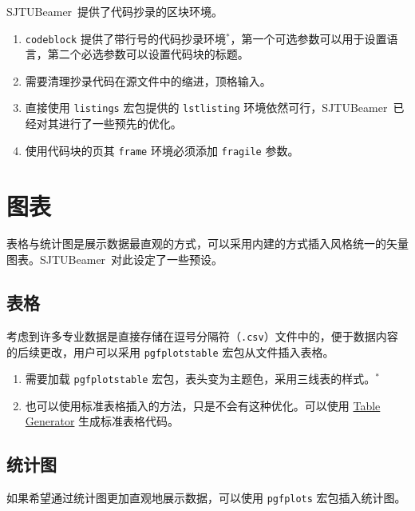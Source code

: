 \documentclass[
    UTF8,
    heading=true,
    12pt,
    a4paper
]{ctexrep}
\def\themename{\textsf{SJTUBeamer}}
\begin{document}
    \themename\ 提供了代码抄录的区块环境。


    \begin{enumerate}\small
        \item \texttt{codeblock} 提供了带行号的代码抄录环境$^*$，第一个可选参数可以用于设置语言，第二个必选参数可以设置代码块的标题。
        \item 需要清理抄录代码在源文件中的缩进，顶格输入。
        \item 直接使用 \texttt{listings} 宏包提供的 \texttt{lstlisting} 环境依然可行，\themename\ 已经对其进行了一些预先的优化。
        \item[\faWarning] 使用代码块的页其 \texttt{frame} 环境必须添加 \texttt{fragile} 参数。
    \end{enumerate}

    \chapter{图表}

    表格与统计图是展示数据最直观的方式，可以采用内建的方式插入风格统一的矢量图表。\themename\ 对此设定了一些预设。

    \section{表格}

    考虑到许多专业数据是直接存储在逗号分隔符（\texttt{.csv}）文件中的，便于数据内容的后续更改，用户可以采用 \texttt{pgfplotstable} 宏包从文件插入表格。


    \begin{enumerate}\small
        \item 需要加载 \texttt{pgfplotstable} 宏包，表头变为主题色，采用三线表的样式。$^*$
        \item 也可以使用标准表格插入的方法，只是不会有这种优化。可以使用 \href{https://www.tablesgenerator.com/latex_tables}{Table Generator} 生成标准表格代码。
    \end{enumerate}

    \section{统计图}

    如果希望通过统计图更加直观地展示数据，可以使用 \texttt{pgfplots} 宏包插入统计图。
\end{document}
